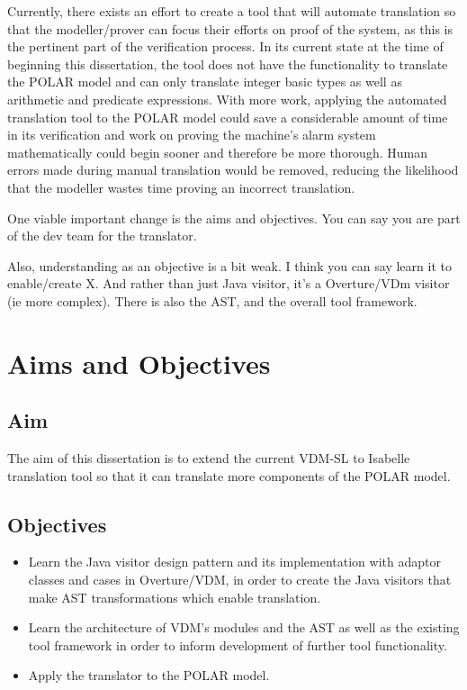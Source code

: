Currently, there exists an effort to create a tool that will automate translation so that the modeller/prover can focus their efforts on proof of the system, as this is the pertinent part of the verification process\parencite{VDM2ISAGit}. In its current state at the time of beginning this dissertation, the tool does not have the functionality to translate the POLAR model and can only translate integer basic types as well as arithmetic and predicate expressions. With more work, applying the automated translation tool to the POLAR model could save a considerable amount of time in its verification and work on proving the machine's alarm system mathematically could begin sooner and therefore be more thorough. Human errors made during manual translation would be removed, reducing the likelihood that the modeller wastes time proving an incorrect translation.

One viable important change is the aims and objectives. You can say you are part of the dev team for the translator. 

Also, understanding as an objective is a bit weak. I think you can say learn it to enable/create X. And rather than just Java visitor, it’s a Overture/VDm visitor (ie more complex). There is also the AST, and the overall tool framework.

\section{Aims and Objectives} 
\subsection{Aim}
The aim of this dissertation is to extend the current VDM-SL to Isabelle translation tool so that it can translate more components of the POLAR model.
\subsection{Objectives} \label{objectives}
\begin{itemize}
	\item Learn the Java visitor design pattern and its implementation with adaptor classes and cases in Overture/VDM, in order to create the Java visitors that make AST transformations which enable translation.
	\item Learn the architecture of VDM's modules and the AST as well as the existing tool framework in order to inform development of further tool functionality.
	\item Apply the translator to the POLAR model.
\end{itemize}

